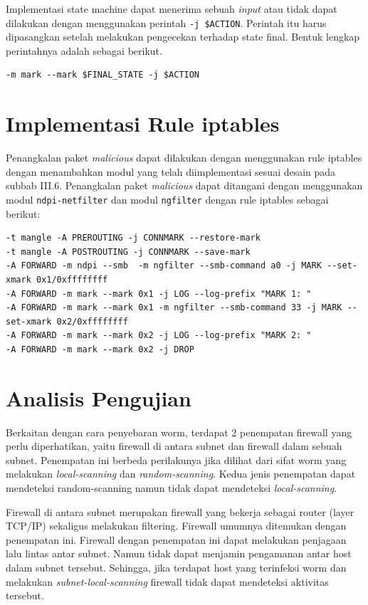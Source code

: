 Implementasi state machine dapat menerima sebuah \textit{input} atau tidak dapat dilakukan dengan menggunakan perintah \verb|-j $ACTION|. Perintah itu harus dipasangkan setelah melakukan pengecekan terhadap state final. Bentuk lengkap perintahnya adalah sebagai berikut.

\begin{lstlisting}
-m mark --mark $FINAL_STATE -j $ACTION
\end{lstlisting}

\section{Implementasi Rule iptables}

Penangkalan paket \textit{malicious} dapat dilakukan dengan menggunakan rule iptables dengan menambahkan modul yang telah diimplementasi sesuai desain pada subbab III.6. Penangkalan paket \textit{malicious} dapat ditangani dengan menggunakan modul \verb|ndpi-netfilter| dan modul \verb|ngfilter| dengan rule iptables sebagai berikut:

\begin{lstlisting}
-t mangle -A PREROUTING -j CONNMARK --restore-mark
-t mangle -A POSTROUTING -j CONNMARK --save-mark
-A FORWARD -m ndpi --smb  -m ngfilter --smb-command a0 -j MARK --set-xmark 0x1/0xffffffff
-A FORWARD -m mark --mark 0x1 -j LOG --log-prefix "MARK 1: "
-A FORWARD -m mark --mark 0x1 -m ngfilter --smb-command 33 -j MARK --set-xmark 0x2/0xffffffff
-A FORWARD -m mark --mark 0x2 -j LOG --log-prefix "MARK 2: "
-A FORWARD -m mark --mark 0x2 -j DROP
\end{lstlisting} 

\section{Analisis Pengujian}

Berkaitan dengan cara penyebaran worm, terdapat 2 penempatan firewall yang perlu diperhatikan, yaitu firewall di antara subnet dan firewall dalam sebuah subnet. Penempatan ini berbeda perilakunya jika dilihat dari sifat worm yang melakukan \textit{local-scanning} dan \textit{random-scanning}. Kedua jenis penempatan dapat mendeteksi random-scanning namun tidak dapat mendeteksi \textit{local-scanning}.

Firewall di antara subnet merupakan firewall yang bekerja sebagai router (layer TCP/IP) sekaligus melakukan filtering. Firewall umumnya ditemukan dengan penempatan ini. Firewall dengan penempatan ini dapat melakukan penjagaan lalu lintas antar subnet. Namun tidak dapat menjamin pengamanan antar host dalam subnet tersebut. Sehingga, jika terdapat host yang terinfeksi worm dan melakukan \textit{subnet-local-scanning} firewall tidak dapat mendeteksi aktivitas tersebut.

